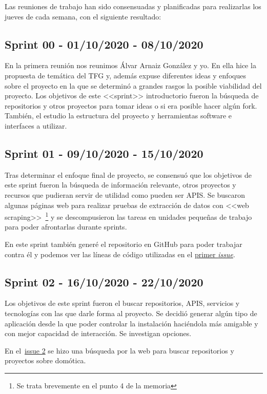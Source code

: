 Las reuniones de trabajo han sido consensuadas y planificadas para realizarlas los jueves de cada semana, con el siguiente resultado:

\subsection{Sprint 00 - 01/10/2020 - 08/10/2020}
En la primera reunión nos reunimos Álvar Arnaiz González y yo. En ella hice la propuesta de temática del TFG y, además expuse diferentes ideas y enfoques sobre el proyecto en la que se determinó a grandes rasgos la posible viabilidad del proyecto.
Los objetivos de este <<sprint>> introductorio fueron la búsqueda de repositorios y otros proyectos para tomar ideas o si era posible hacer algún fork. También, el estudio la estructura del proyecto y herramientas software e interfaces a utilizar.

\subsection{Sprint 01 - 09/10/2020 - 15/10/2020}
Tras determinar el enfoque final de proyecto, se consensuó que los objetivos de este sprint fueron la búsqueda de información relevante, otros proyectos y recursos que pudieran servir de utilidad como pueden ser APIS. Se buscaron algunas páginas web para realizar pruebas de extracción de datos con <<web scraping>>~\footnote{Se trata brevemente en el punto 4 de la memoria} y se descompusieron las tareas en unidades pequeñas de trabajo para poder afrontarlas durante sprints.

En este sprint también generé el repositorio en GitHub para poder trabajar contra él y podemos ver las líneas de código utilizadas en el \href{https://github.com/davidelinformatico/TFG/issues/1}{primer \textit{issue}}.

\subsection{Sprint 02 - 16/10/2020 - 22/10/2020}
Los objetivos de este sprint fueron el buscar repositorios, APIS, servicios y tecnologías con las que darle forma al proyecto. Se decidió generar algún tipo de aplicación desde la que poder controlar la instalación haciéndola más amigable y con mejor capacidad de interacción. Se investigan opciones.

En el~\href{https://github.com/davidelinformatico/TFG/issues/2}{issue 2} se hizo una búsqueda por la web para buscar repositorios y proyectos sobre domótica.

